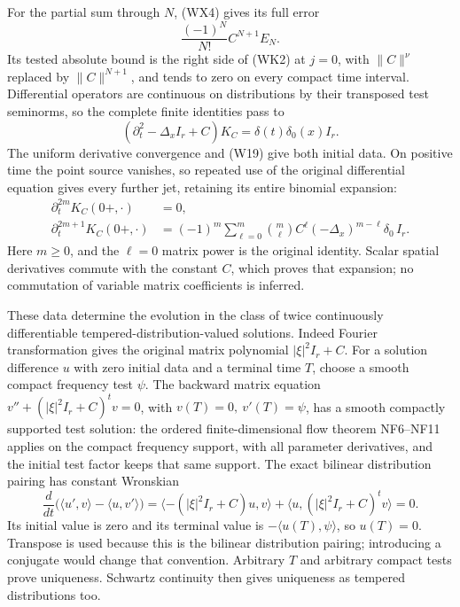 \documentclass[
  11pt,
]{article}
\begin{document}
For the partial sum through \(N\), (WX4) gives its full error \[
 \frac{(-1)^N}{N!}C^{N+1}E_N.
 \tag{WK3}
\] Its tested absolute bound is the right side of (WK2) at \(j=0\), with
\(\|C\|^\nu\) replaced by \(\|C\|^{N+1}\), and tends to zero on every
compact time interval. Differential operators are continuous on
distributions by their transposed test seminorms, so the complete finite
identities pass to \[
 (\partial_t^2-\Delta_x I_r+C)K_C
                 =\delta(t)\delta_0(x)I_r.
 \tag{WK4}
\] The uniform derivative convergence and (W19) give both initial data.
On positive time the point source vanishes, so repeated use of the
original differential equation gives every further jet, retaining its
entire binomial expansion: \[
\begin{split}
 \partial_t^{2m}K_C(0+,\cdot)&=0,\\
 \partial_t^{2m+1}K_C(0+,\cdot)
    &=(-1)^m\sum_{\ell=0}^m
       \binom m\ell C^\ell(-\Delta_x)^{m-\ell}\delta_0\,I_r .
\end{split}
 \tag{WK5}
\] Here \(m\geq0\), and the \(\ell=0\) matrix power is the original
identity. Scalar spatial derivatives commute with the constant \(C\),
which proves that expansion; no commutation of variable matrix
coefficients is inferred.

These data determine the evolution in the class of twice continuously
differentiable tempered-distribution-valued solutions. Indeed Fourier
transformation gives the original matrix polynomial \(|\xi|^2I_r+C\).
For a solution difference \(u\) with zero initial data and a terminal
time \(T\), choose a smooth compact frequency test \(\psi\). The
backward matrix equation \(v''+(|\xi|^2I_r+C)^t v=0\), with
\(v(T)=0,\ v'(T)=\psi\), has a smooth compactly supported test solution:
the ordered finite-dimensional flow theorem NF6--NF11 applies on the
compact frequency support, with all parameter derivatives, and the
initial test factor keeps that same support. The exact bilinear
distribution pairing has constant Wronskian \[
 \frac{d}{dt}\big(\langle u',v\rangle-\langle u,v'\rangle\big)
       =\langle-(|\xi|^2I_r+C)u,v\rangle
           +\langle u,(|\xi|^2I_r+C)^t v\rangle=0 .
 \tag{WK6}
\] Its initial value is zero and its terminal value is
\(-\langle u(T),\psi\rangle\), so \(u(T)=0\). Transpose is used because
this is the bilinear distribution pairing; introducing a conjugate would
change that convention. Arbitrary \(T\) and arbitrary compact tests
prove uniqueness. Schwartz continuity then gives uniqueness as tempered
distributions too.
\end{document}
